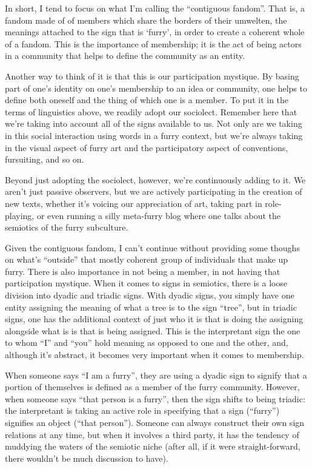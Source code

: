In short, I tend to focus on what I'm calling the ``contiguous fandom''. That is, a fandom made of of members which share the borders of their umwelten, the meanings attached to the sign that is `furry', in order to create a coherent whole of a fandom. This is the importance of membership; it is the act of being actors in a community that helps to define the community as an entity.

Another way to think of it is that this is our participation mystique. By basing part of one's identity on one's membership to an idea or community, one helps to define both oneself and the thing of which one is a member. To put it in the terms of linguistics above, we readily adopt our sociolect. Remember here that we're taking into account all of the signs available to us. Not only are we taking in this social interaction using words in a furry context, but we're always taking in the visual aspect of furry art and the participatory aspect of conventions, fursuiting, and so on.

Beyond just adopting the sociolect, however, we're continuously adding to it. We aren't just passive observers, but we are actively participating in the creation of new texts, whether it's voicing our appreciation of art, taking part in role-playing, or even running a silly meta-furry blog where one talks about the semiotics of the furry subculture.

Given the contiguous fandom, I can't continue without providing some thoughs on what's ``outside'' that mostly coherent group of individuals that make up furry. There is also importance in not being a member, in not having that participation mystique. When it comes to signs in semiotics, there is a loose division into dyadic and triadic signs. With dyadic signs, you simply have one entity assigning the meaning of what a tree is to the sign ``tree'', but in triadic signs, one has the additional context of just who it is that is doing the assigning alongside what is is that is being assigned. This is the interpretant sign the one to whom ``I'' and ``you'' hold meaning as opposed to one and the other, and, although it's abstract, it becomes very important when it comes to membership.

When someone says ``I am a furry'', they are using a dyadic sign to signify that a portion of themselves is defined as a member of the furry community. However, when someone says ``that person is a furry'', then the sign shifts to being triadic: the interpretant is taking an active role in specifying that a sign (``furry'') signifies an object (``that person''). Someone can always construct their own sign relations at any time, but when it involves a third party, it has the tendency of muddying the waters of the semiotic niche (after all, if it were straight-forward, there wouldn't be much discussion to have).

